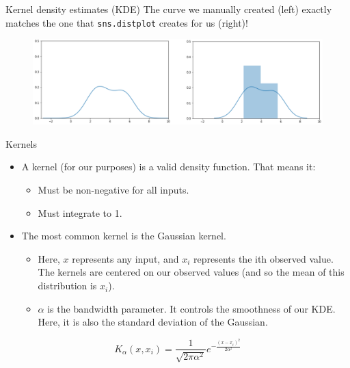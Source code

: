 \documentclass[aspectratio=169]{../latex_main/tntbeamer}  %
\begin{document}
	
	
	\begin{frame}{Kernel density estimates (KDE)}
	    The curve we manually created (left) exactly matches the one that \texttt{sns.distplot} creates for us (right)!
	    \begin{figure}
	        \centering
	        \includegraphics[scale=.4]{Bild88}
	    \end{figure}
	\end{frame}
	
	
	\begin{frame}{Kernels}
	    \begin{itemize}
	        \item A kernel (for our purposes) is a valid density function. That means it:
	        \begin{itemize}
	            \item Must be non-negative for all inputs.
	            \item Must integrate to 1.
	        \end{itemize}
	        \item The most common kernel is the Gaussian kernel.
	        \begin{itemize}
	            \item Here, $x$ represents any input, and $x_i$ represents the ith observed value. The kernels are centered on our observed values (and so the mean of this distribution is $x_i$).
	            \item $\alpha$ is the bandwidth parameter. It controls the smoothness of our KDE. Here, it is also the standard deviation of the Gaussian.
	        \end{itemize}
	    \end{itemize}
	    
	    \begin{equation*}
	        K_\alpha (x,x_i) = \frac{1}{\sqrt{2\pi\alpha^2}}e^{-\frac{(x-x_i)^2}{2\alpha^2}}
	    \end{equation*}
	\end{frame}
	
	
	
\end{document}
